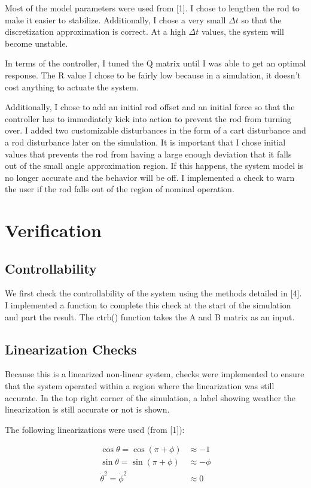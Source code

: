 \documentclass{article}
\begin{document}
Most of the model parameters were used from [1]. I chose to lengthen the rod to make it easier to stabilize. Additionally, I chose a very small $\Delta t$ so that the discretization approximation is correct. At a high $\Delta t$ values, the system will become unstable. 

In terms of the controller, I tuned the Q matrix until I was able to get an optimal response. The R value I chose to be fairly low because in a simulation, it doesn't cost anything to actuate the system.

Additionally, I chose to add an initial rod offset and an initial force so that the controller has to immediately kick into action to prevent the rod from turning over. I added two customizable disturbances in the form of a cart disturbance and a rod disturbance later on the simulation. It is important that I chose initial values that prevents the rod from having a large enough deviation that it falls out of the small angle approximation region. If this happens, the system model is no longer accurate and the behavior will be off. I implemented a check to warn the user if the rod falls out of the region of nominal operation.


\section{Verification}

\subsection{Controllability}
We first check the controllability of the system using the methods detailed in [4]. I implemented a function to complete this check at the start of the simulation and part the result. The ctrb() function takes the A and B matrix as an input.

\subsection{Linearization Checks}
Because this is a linearized non-linear system, checks were implemented to ensure that the system operated within a region where the linearization was still accurate. In the top right corner of the simulation, a label showing weather the linearization is still accurate or not is shown.

The following linearizations were used (from [1]):

\begin{align}
    \cos{\theta} = \cos{(\pi + \phi)} &\approx -1 \\
    \sin{\theta} = \sin{(\pi + \phi)} &\approx -\phi \\
    \Dot{\theta}^2 = \Dot{\phi}^2 &\approx 0 \\
\end{align}
\end{document}
